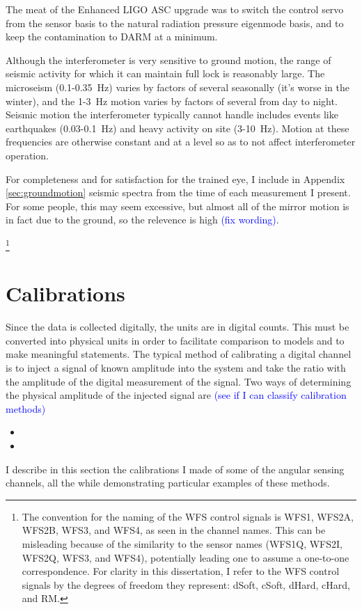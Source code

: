 The meat of the Enhanced LIGO ASC upgrade was to switch the control servo
from the sensor basis to the natural radiation pressure eigenmode
basis, and to keep the contamination to DARM at a minimum. 


Although the interferometer is very sensitive to ground motion, the
range of seismic activity for which it can maintain full lock is
reasonably large. The microseism (0.1-0.35~Hz) varies by factors of
several seasonally (it's worse in the winter), and the 1-3~Hz motion
varies by factors of several from day to night. Seismic motion the
interferometer typically cannot handle includes events like
earthquakes (0.03-0.1~Hz) and heavy activity on site (3-10~Hz). Motion
at these frequencies are otherwise constant and at a level so as to
not affect interferometer operation. 

For completeness and for satisfaction for the trained eye, I include
in Appendix \ref{sec:groundmotion} seismic spectra from the time of
each measurement I present. For some people, this may seem excessive,
but almost all of the mirror motion is in fact due to the ground, so
the relevence is high \textcolor{blue}{(fix wording)}. 


\footnote{The convention for the naming of the WFS control signals is
  WFS1, WFS2A, WFS2B, WFS3, and WFS4, as seen in the channel
  names. This can be misleading because of the similarity to the
  sensor names (WFS1Q, WFS2I, WFS2Q, WFS3, and WFS4), potentially
  leading one to assume a one-to-one correspondence. For clarity in
  this dissertation, I refer to the WFS control signals by the degrees of
  freedom they represent: dSoft, cSoft, dHard, cHard, and RM.}





\section{Calibrations}
Since the data is collected digitally, the units are in digital
counts. This must be converted into physical units in order to
facilitate comparison to models and to make meaningful statements. The
typical method of calibrating a digital channel is to inject a signal
of known amplitude into the system and take the ratio with the
amplitude of the digital measurement of the signal. Two ways of
determining the physical amplitude of the injected signal are
\textcolor{blue}{(see if I can classify calibration methods)}
\begin{itemize}
\item 
\item 
\end{itemize}
I describe in this section the calibrations I made of some of the
angular sensing channels, all the while demonstrating particular
examples of these methods.


